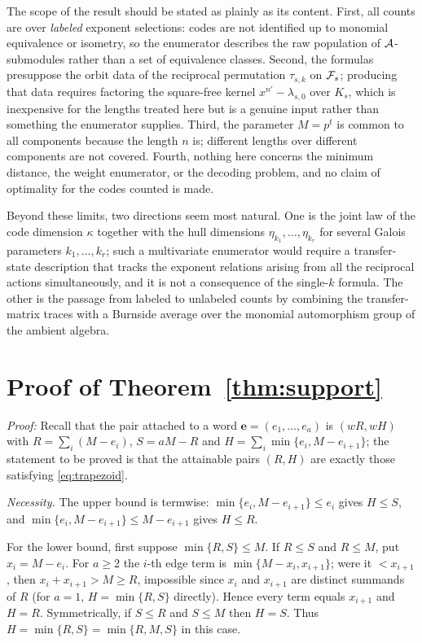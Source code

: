 The scope of the result should be stated as plainly as its content. First, all
counts are over \emph{labeled} exponent selections: codes are not identified up
to monomial equivalence or isometry, so the enumerator describes the raw
population of $\mathcal A$-submodules rather than a set of equivalence classes.
Second, the formulas presuppose the orbit data of the reciprocal permutation
$\tau_{s,k}$ on $\mathcal F_s$; producing that data requires factoring the square-free
kernel $x^{n'}-\lambda_{s,0}$ over $K_s$, which is inexpensive for the lengths
treated here but is a genuine input rather than something the enumerator
supplies. Third, the parameter $M=p^t$ is common to all components because the
length $n$ is; different lengths over different components are not covered.
Fourth, nothing here concerns the minimum distance, the weight enumerator, or
the decoding problem, and no claim of optimality for the codes counted is made.

Beyond these limits, two directions seem most natural. One is the joint law of
the code dimension $\kappa$ together with the hull dimensions
$\eta_{k_1},\ldots,\eta_{k_r}$ for several Galois parameters
$k_1,\ldots,k_r$; such a multivariate enumerator would require a transfer-state
description that tracks the exponent relations arising from all the reciprocal
actions simultaneously, and it is not a consequence of the single-$k$ formula.
The other is the passage from labeled to unlabeled counts by combining the
transfer-matrix traces with a Burnside average over the monomial automorphism
group of the ambient algebra.

\appendices

\section{Proof of Theorem~\ref{thm:support}}\label{app:support}

\noindent\emph{Proof:} Recall that the pair attached to a word
$\mathbf{e}=(e_1,\ldots,e_a)$ is $(wR,wH)$ with
$R=\sum_i(M-e_i)$, $S=aM-R$ and $H=\sum_i\min\{e_i,M-e_{i+1}\}$; the
statement to be proved is that the attainable pairs $(R,H)$ are exactly those
satisfying \eqref{eq:trapezoid}.

\emph{Necessity.}  The upper bound is termwise:
$\min\{e_i,M-e_{i+1}\}\leq e_i$ gives $H\leq S$, and
$\min\{e_i,M-e_{i+1}\}\leq M-e_{i+1}$ gives $H\leq R$.

For the lower bound, first suppose $\min\{R,S\}\leq M$.  If $R\leq S$ and
$R\leq M$, put $x_i=M-e_i$.  For $a\geq2$ the $i$-th edge term is
$\min\{M-x_i,x_{i+1}\}$; were it $<x_{i+1}$, then $x_i+x_{i+1}>M\geq R$,
impossible since $x_i$ and $x_{i+1}$ are distinct summands of $R$ (for $a=1$,
$H=\min\{R,S\}$ directly).  Hence every term equals $x_{i+1}$ and $H=R$.
Symmetrically, if $S\leq R$ and $S\leq M$ then $H=S$.  Thus
$H=\min\{R,S\}=\min\{R,M,S\}$ in this case.

